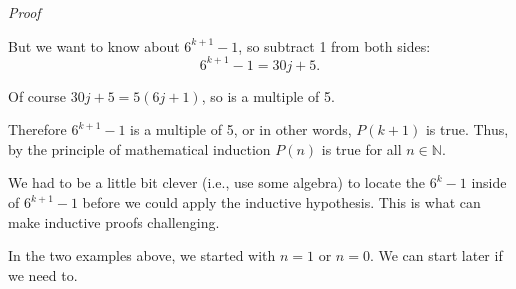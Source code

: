 \documentclass[11pt,]{book}
\makeatletter
\theoremstyle{ptxplainnotitle}
\theoremstyle{ptxplaintitle}
\renewcommand*{\proofname}{Proof}
\renewenvironment{proof}[1][\proofname]{\par
  \pushQED{\qed}%
  \normalfont \topsep6\p@\@plus6\p@\relax
  \trivlist
  \item\relax
    {\itshape
    #1\@addpunct{.}}\hspace\labelsep\ignorespaces
}{%
  \popQED\endtrivlist\@endpefalse
}
\theoremstyle{ptxdefinitionnotitle}
\theoremstyle{ptxdefinitiontitle}
\theoremstyle{ptxdefinitionnotitle}
\theoremstyle{ptxdefinitiontitle}
\theoremstyle{ptxdefinitionnotitle}
\theoremstyle{ptxdefinitiontitle}
\theoremstyle{ptxdefinitiontitlenonumber}
\theoremstyle{ptxdefinitiontitlenonumber}
\numberwithin{equation}{chapter}
\newcommand{\N}{\mathbb N}
\makeatother
\begin{document}
\begin{example}
\begin{proof}
%
\par
\hypertarget{p-582}{}%
But we want to know about \(6^{k+1} - 1\), so subtract 1 from both sides:%
\begin{equation*}
6^{k+1} - 1 = 30j + 5.
\end{equation*}
%
\par
\hypertarget{p-583}{}%
Of course \(30j+5 = 5(6j+1)\), so is a multiple of 5.%
\par
\hypertarget{p-584}{}%
Therefore \(6^{k+1} - 1\) is a multiple of 5, or in other words, \(P(k+1)\) is true. Thus, by the principle of mathematical induction \(P(n)\) is true for all \(n \in \N\).%
\end{proof}
\end{example}
\hypertarget{p-585}{}%
We had to be a little bit clever (i.e., use some algebra) to locate the \(6^k - 1\) inside of \(6^{k+1} - 1\) before we could apply the inductive hypothesis. This is what can make inductive proofs challenging.%
\par
\hypertarget{p-586}{}%
In the two examples above, we started with \(n = 1\) or \(n = 0\). We can start later if we need to.%
\end{document}
